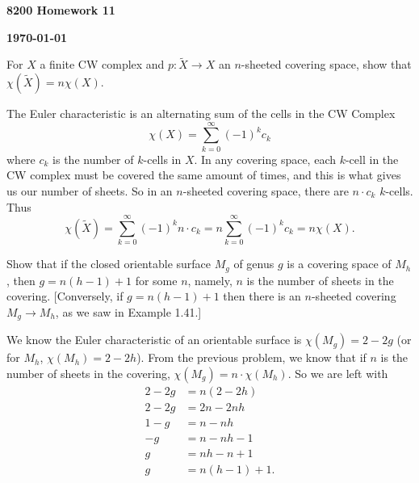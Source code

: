 \documentclass[12pt]{article}
\begin{document}
\begin{newtitle}
  \begin{center}
    \textbf{\Huge 8200 Homework 11}
  \end{center}
  \textbf{} \hfill \textbf{\today}
\end{newtitle}

\begin{statement}[2.2.22]
    For $X$ a finite CW complex and $p : \widetilde{X} \to X$ an $n$-sheeted covering space, show that $ \chi(\widetilde{X}) = n \chi(X). $
\end{statement}
\begin{newproof}
    The Euler characteristic is an alternating sum of the cells in the CW Complex
    $$ \chi(X) = \sum^{\infty}_{k=0} (-1)^k c_k $$
    where $c_k$ is the number of $k$-cells in $X$. In any covering space, each $k$-cell in the CW complex must be covered the same amount of times, and this is what gives us our number of sheets. So in an $n$-sheeted covering space, there are $n \cdot c_k$ $k$-cells. Thus
    $$ \chi(\tilde{X}) = \sum^{\infty}_{k=0} (-1)^k n \cdot c_k = n \sum^{\infty}_{k=0} (-1)^k c_k = n \chi(X).$$
\end{newproof}

\begin{statement}[2.2.23]
    Show that if the closed orientable surface $M_g$ of genus $g$ is a covering space of $M_h$, then $ g = n(h - 1) + 1 $ for some $n$, namely, $n$ is the number of sheets in the covering. [Conversely, if $g = n(h - 1) + 1$ then there is an $n$-sheeted covering $M_g \to M_h$, as we saw in Example 1.41.]
\end{statement}
\begin{newproof}
    We know the Euler characteristic of an orientable surface is $\chi(M_g)=2-2g$ (or for $M_h$, $\chi(M_h)=2-2h$). From the previous problem, we know that if $n$ is the number of sheets in the covering, $\chi(M_g)= n \cdot \chi(M_h)$. So we are left with
    \begin{align*}
        2-2g &= n(2-2h) \\
        2-2g &= 2n -2nh \\
        1-g &= n - nh \\
        -g &= n -nh - 1 \\
        g &= nh - n + 1 \\
        g &= n(h-1) + 1.
    \end{align*}
\end{newproof}
\end{document}
